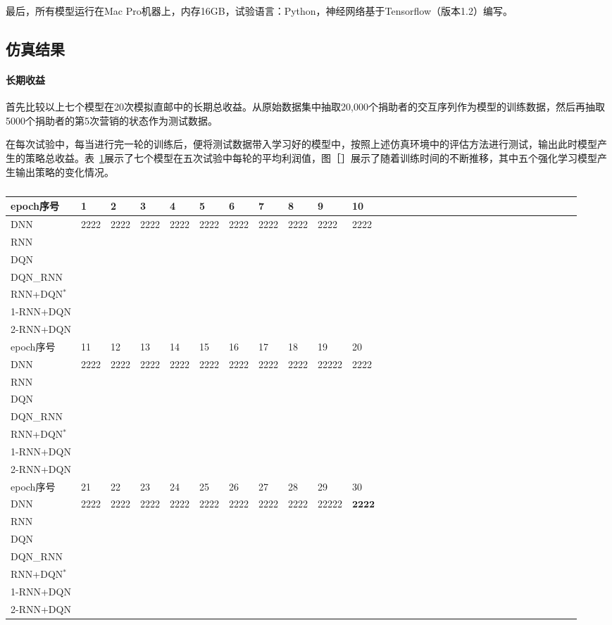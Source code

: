 最后，所有模型运行在Mac Pro机器上，内存16GB，试验语言：Python，神经网络基于Tensorflow（版本1.2）编写。

\subsection{仿真结果}
\paragraph{长期收益}

 首先比较以上七个模型在20次模拟直邮中的长期总收益。从原始数据集中抽取20,000个捐助者的交互序列作为模型的训练数据，然后再抽取5000个捐助者的第5次营销的状态作为测试数据。

 在每次试验中，每当进行完一轮的训练后，便将测试数据带入学习好的模型中，按照上述仿真环境中的评估方法进行测试，输出此时模型产生的策略总收益。表~\ref{tab:4result1}展示了七个模型在五次试验中每轮的平均利润值，图［］展示了随着训练时间的不断推移，其中五个强化学习模型产生输出策略的变化情况。

  \begin{table}[htbp]
  \centering
  \footnotesize
  \caption{}
  \label{tab:4result1}
  \begin{tabular}{lllllllllllllllllllllllllllllll}  
    \toprule
      epoch序号 &1&2&3&4&5&6&7&8&9&10\\
    \midrule
      DNN &2222&2222&2222&2222&2222&2222&2222&2222&2222&2222\\
      RNN & \\
      DQN & \\
      DQN_RNN & \\
      RNN+DQN$^{*}$ & \\
      1-RNN+DQN & \\
      2-RNN+DQN & \\
     \toprule
      epoch序号 &11&12&13&14&15&16&17&18&19&20\\
    \midrule
      DNN &2222&2222&2222&2222&2222&2222&2222&2222&22222&2222\\
      RNN & \\
      DQN & \\
      DQN_RNN & \\
      RNN+DQN$^{*}$ & \\
      1-RNN+DQN & \\
      2-RNN+DQN & \\
     \toprule
      epoch序号 &21&22&23&24&25&26&27&28&29&30\\
    \midrule
      DNN &2222&2222&2222&2222&2222&2222&2222&2222&22222&$\bm{2222}$\\
      RNN & \\
      DQN & \\
      DQN_RNN & \\
      RNN+DQN$^{*}$ & \\
      1-RNN+DQN & \\
      2-RNN+DQN & \\
    \bottomrule
  \end{tabular}
\end{table}

